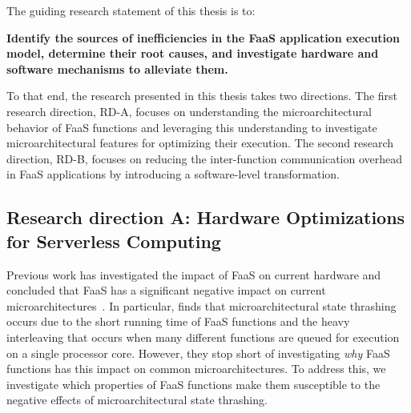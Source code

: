 \documentclass[../main.tex]{subfiles}
\begin{document}
\begin{refsection}
The guiding research statement of this thesis is to:
\begin{framed}
\noindent
\textbf{Identify the sources of inefficiencies in the FaaS application execution model, determine their root causes, and investigate hardware and software mechanisms to alleviate them.}
\end{framed}
\noindent
To that end, the research presented in this thesis takes two
directions. The first research direction, RD-A, focuses on
understanding the microarchitectural behavior of FaaS functions and
leveraging this understanding to investigate microarchitectural
features for optimizing their execution.
The second research direction, RD-B, focuses on reducing the
inter-function communication overhead in FaaS applications by
introducing a software-level transformation.


\subsection{Research direction A: Hardware Optimizations for Serverless Computing}
\label{sec:rda}

Previous work has investigated the
impact of FaaS on current hardware and concluded that FaaS has a
significant negative impact on current
microarchitectures~\cite{shahrad19_archit_implic_funct_servic_comput,lukewarm_serverless}. In
particular, \textcite{lukewarm_serverless} finds that
microarchitectural state thrashing occurs due to the short running
time of FaaS functions and the heavy interleaving that occurs when many
different functions are queued for execution on a single processor core. However, they stop short of investigating \emph{why} FaaS
functions has this impact on common microarchitectures. To address this, we investigate which properties of FaaS functions
make them susceptible to the negative effects of microarchitectural
state thrashing.


\end{refsection}
\end{document}
